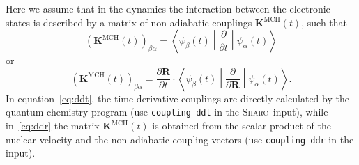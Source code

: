 \documentclass[a4paper,11pt,DIV=15,openany,twoside=false]{scrbook}
\newcommand{\sharc}{\textsc{Sharc}}
\newcommand{\ttt}[1]{\texttt{#1}}
\renewcommand{\vec}[1]{\ensuremath{\mathbf{#1}}}
\begin{document}
Here we assume that in the dynamics the interaction between the electronic states is described by a matrix of non-adiabatic couplings $\vec{K}^{\text{MCH}}(t)$, such that
\begin{equation}
  \left(\vec{K}^{\text{MCH}}(t)\right)_{\beta\alpha}
  =
  \left\langle
    \psi_\beta(t)
  \middle|
    \frac{\partial}{\partial t}
  \middle|
    \psi_\alpha(t)
  \right\rangle
  \label{eq:ddt}
\end{equation}
or
\begin{equation}
  \left(\vec{K}^{\text{MCH}}(t)\right)_{\beta\alpha}
  =
  \frac{\partial \vec{R}}{\partial t}\cdot
  \left\langle
    \psi_\beta(t)
  \middle|
    \frac{\partial}{\partial \vec{R}}
  \middle|
    \psi_\alpha(t)
  \right\rangle.
  \label{eq:ddr}
\end{equation}
In equation~\eqref{eq:ddt}, the time-derivative couplings are directly calculated by the quantum chemistry program (use \ttt{coupling ddt} in the \sharc\ input), while in~\eqref{eq:ddr} the matrix $\vec{K}^{\text{MCH}}(t)$ is obtained from the scalar product of the nuclear velocity and the non-adiabatic coupling vectors (use \ttt{coupling ddr} in the input).
\end{document}
